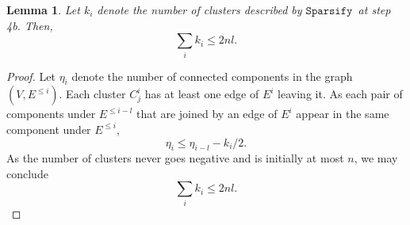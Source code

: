 \documentclass[11pt]{article}
\newtheorem{lemma}[theorem]{Lemma}
\newcommand{\sparsify}{\ensuremath{\mathtt{Sparsify}}}
\begin{document}
\begin{lemma}\label{lem:sparsifyNumClusters}
Let $k_{i}$ denote the number of clusters described by \sparsify \
  at step 4b.
Then,
\[
  \sum_{i} k_{i} \leq  2 nl.
\]
\end{lemma}
\begin{proof}
Let $\eta_{i}$ denote the number of connected components
  in the graph $(V,E^{\leq i})$.
Each cluster $C^{i}_{j}$ has at least one edge of $E^{i}$
  leaving it.
As each pair of components under $E^{\leq i - l}$ that are joined by
  an edge of $E^{i}$ appear in the same component under $E^{\leq i}$,
\[
  \eta_{i} \leq \eta_{i-l} - k_{i}/2.
\]
As the number of clusters never goes negative and is initially at
  most $n$, we may conclude
\[
  \sum_{i} k_{i} \leq 2 nl.
\]
\end{proof}
\end{document}
